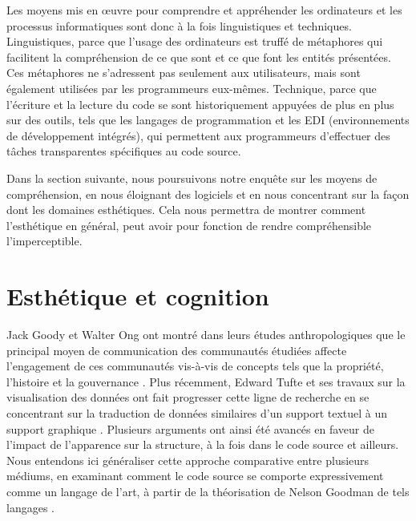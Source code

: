 \documentclass{article}
\begin{document}
Les moyens mis en œuvre pour comprendre et appréhender les ordinateurs et les processus informatiques sont donc à la fois linguistiques et techniques. Linguistiques, parce que l'usage des ordinateurs est truffé de métaphores qui facilitent la compréhension de ce que sont et ce que font les entités présentées. Ces métaphores ne s'adressent pas seulement aux utilisateurs, mais sont également utilisées par les programmeurs eux-mêmes. Technique, parce que l'écriture et la lecture du code se sont historiquement appuyées de plus en plus sur des outils, tels que les langages de programmation et les EDI (environnements de développement intégrés), qui permettent aux programmeurs d'effectuer des tâches transparentes spécifiques au code source.

Dans la section suivante, nous poursuivons notre enquête sur les moyens de compréhension, en nous éloignant des logiciels et en nous concentrant sur la façon dont les domaines esthétiques. Cela nous permettra de montrer comment l'esthétique en général, peut avoir pour fonction de rendre compréhensible l'imperceptible.

\section*{Esthétique et cognition}

Jack Goody et Walter Ong ont montré dans leurs études anthropologiques que le principal moyen de communication des communautés étudiées affecte l'engagement de ces communautés vis-à-vis de concepts tels que la propriété, l'histoire et la gouvernance \citep{ong_orality_2012,goody_logic_1986}. Plus récemment, Edward Tufte et ses travaux sur la visualisation des données ont fait progresser cette ligne de recherche en se concentrant sur la traduction de données similaires d'un support textuel à un support graphique \citep{tufte_visual_2001}. Plusieurs arguments ont ainsi été avancés en faveur de l'impact de l'apparence sur la structure, à la fois dans le code source et ailleurs. Nous entendons ici généraliser cette approche comparative entre plusieurs médiums, en examinant comment le code source se comporte expressivement comme un langage de l'art, à partir de la théorisation de Nelson Goodman de tels langages  \citep{goodman_languages_1976}.
\end{document}
